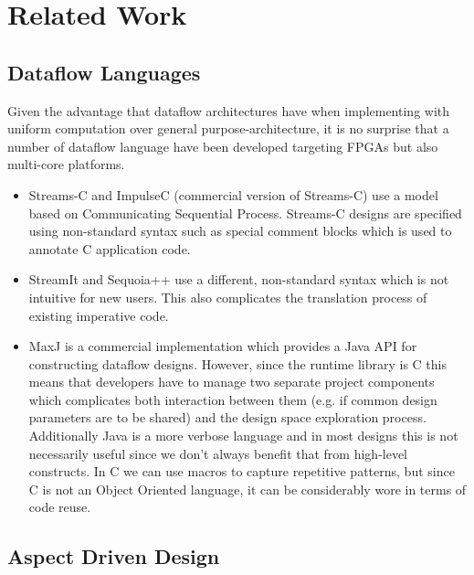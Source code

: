 \section{Related Work}

\subsection{Dataflow Languages}


Given the advantage that dataflow architectures have when implementing with
uniform computation over general purpose-architecture, it is no
surprise that a number of dataflow language have been developed
targeting FPGAs but also multi-core platforms.

\begin{itemize}

\item Streams-C\cite{Gokhale:Stone:Arnold:Kalinowski:2000} and
  ImpulseC\cite{ImpulseC} (commercial version of Streams-C) use a model based on
  Communicating Sequential Process. Streams-C designs are specified
  using non-standard syntax such as special comment blocks which is
  used to annotate C application code.

\item StreamIt\cite{Thies:Karczmarek:Amarasinghe:2002} and Sequoia++
  use a different, non-standard syntax which is not intuitive for new
  users. This also complicates the translation process of existing
  imperative code.

\item MaxJ \cite{MaxelerTechnologies:2012} is a commercial
  implementation which provides a Java API for constructing dataflow
  designs. However, since the runtime library is C this means that
  developers have to manage two separate project components which
  complicates both interaction between them (e.g. if common design
  parameters are to be shared) and the design space exploration
  process. Additionally Java is a more verbose language and in most
  designs this is not necessarily useful since we don't always benefit
  that from high-level constructs. In C we can use macros to capture
  repetitive patterns, but since C is not an Object Oriented language,
  it can be considerably wore in terms of code reuse.

\end{itemize}

\subsection{Aspect Driven Design}


